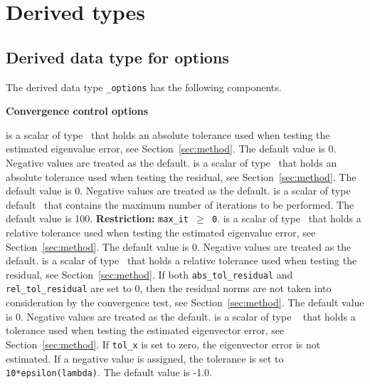 \section{Derived types}

\subsection{Derived data type for options}

\label{sec:options}

The derived data type
{\tt \solver\_options}
has the following components.

\bigskip
\noindent
{\bf Convergence control options}

\begin{description}
%
 is a scalar of type %
\REALDP\ that
holds an absolute tolerance used when testing the estimated eigenvalue 
error, see Section~\ref{sec:method}. 
The default value is 0. %
Negative values are treated as the default.
%
 is a scalar of type %
\REALDP\ that
holds an absolute tolerance used when testing the residual, 
see Section~\ref{sec:method}.
The default value is 0.
Negative values are treated as the default.
%
 is a scalar of type default \Integer\ that
contains the maximum number of iterations to be performed.
The default value is 100. %
{\bf Restriction:} {\tt max\_it $\ge$ 0}.
%
 is a scalar of type %
\REALDP\ that
holds a relative tolerance used when testing the estimated eigenvalue 
error, see Section~\ref{sec:method}. 
The default value is 0. %
Negative values are treated as the default.
%
 is a scalar of type %
\REALDP\ that
holds a relative tolerance used when testing the residual,
see Section~\ref{sec:method}. 
If both {\tt abs\_tol\_residual} and {\tt rel\_tol\_residual}
are set to 0, then the residual norms are not taken
into consideration by the convergence test,
see Section~\ref{sec:method}.
The default value is 0.
Negative values are treated as the default.
%
 is a scalar of type \REALDP\ %
that holds a tolerance used when testing the estimated 
eigenvector error, see Section~\ref{sec:method}. 
If {\tt tol\_x} is set to zero, the eigenvector error is not estimated.
If a negative value is assigned, the tolerance is set to
{\tt 10*epsilon(lambda)}.
The default value is -1.0.
%
\end{description}

